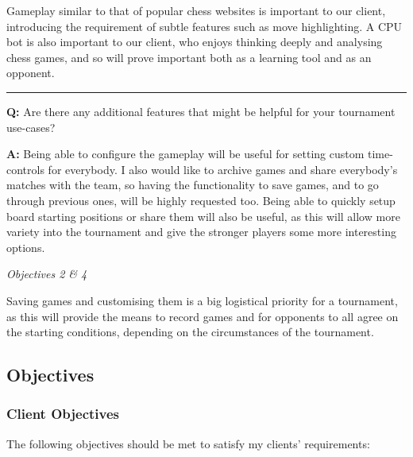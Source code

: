 \documentclass[../main/main.tex]{subfiles}
\begin{document}
\noindent Gameplay similar to that of popular chess websites is important to our client, introducing the requirement of subtle features such as move highlighting. A CPU bot is also important to our client, who enjoys thinking deeply and analysing chess games, and so will prove important both as a learning tool and as an opponent.

\noindent\rule{\textwidth}{0.4pt}

\noindent\textbf{Q:} Are there any additional features that might be helpful for your tournament use-cases?

\noindent\textbf{A:} Being able to configure the gameplay will be useful for setting custom time-controls for everybody. I also would like to archive games and share everybody’s matches with the team, so having the functionality to save games, and to go through previous ones, will be highly requested too. Being able to quickly setup board starting positions or share them will also be useful, as this will allow more variety into the tournament and give the stronger players some more interesting options.

\bigskip

\noindent\textit{Objectives 2 \& 4}

\noindent Saving games and customising them is a big logistical priority for a tournament, as this will provide the means to record games and for opponents to all agree on the starting conditions, depending on the circumstances of the tournament.

\subsection{Objectives}
\subsubsection{Client Objectives}
The following objectives should be met to satisfy my clients’ requirements:
\end{document}
